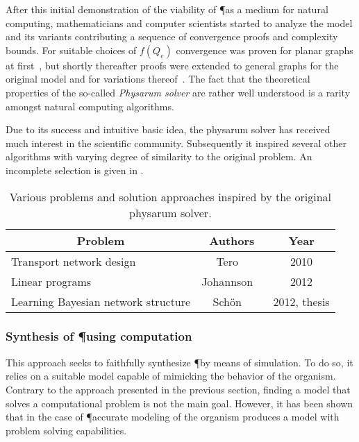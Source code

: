 			After this initial demonstration of the viability of \P as a medium for natural computing, mathematicians and computer scientists started to analyze the model and its variants contributing a sequence of convergence proofs and complexity bounds. For suitable choices of $f(Q_e)$ convergence was proven for planar graphs at first~\cite{miyaji2007mathematical,miyaji2008physarum}, but shortly thereafter proofs were extended to general graphs for the original model and for variations thereof~\cite{Bonifaci2012121,bonifaci2013physarum,ito2011convergence,becchetti2013physarum}. The fact that the theoretical properties of the so-called \emph{Physarum solver} are rather well understood is a rarity amongst natural computing algorithms.

			Due to its success and intuitive basic idea, the physarum solver has received much interest in the scientific community. Subsequently it inspired several other algorithms with varying degree of similarity to the original problem. An incomplete selection is given in . 

			\begin{table}
				\centering
				\begin{tabular}{@{} l *2c @{}}
				\toprule
				 \multicolumn{1}{c}{Problem}    & Authors  & Year   \\ 
				\midrule
				 Transport network design & Tero \etal~\cite{tero2010rules} & 2010 \\
				 Linear programs & Johannson \etal~\cite{Johannson2012} & 2012  \\ 
				 Learning Bayesian network structure & Sch\"on \etal~\cite{schon2012structure} & 2012, thesis  \\ 
				\bottomrule
				\end{tabular}
				\caption[Computing inspired by \P]{Various problems and solution approaches inspired by the original physarum solver.}
				\label{tab:list_inspired}
			\end{table}

			\FloatBarrier

		\subsubsection{Synthesis of \P using computation}

			This approach seeks to faithfully synthesize \P by means of simulation. To do so, it relies on a suitable model capable of mimicking the behavior of the organism. Contrary to the approach presented in the previous section, finding a model that solves a computational problem is not the main goal. However, it has been shown that in the case of \P accurate modeling of the organism produces a model with problem solving capabilities. 

